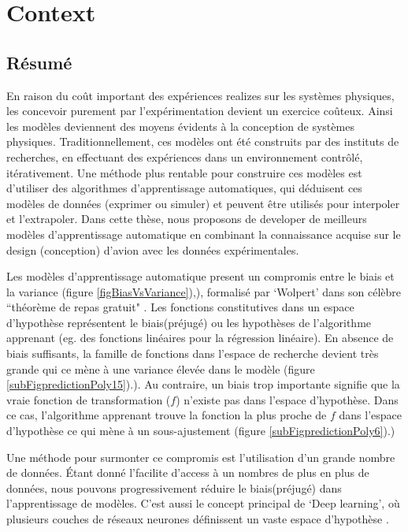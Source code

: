 \chapter{Context}
\label{chapIntroduction}

\begin{mdframed}[hidealllines=true,backgroundcolor=lightgray!20]
\section*{Résumé}
En raison du coût important des expériences realizes sur les systèmes physiques, les concevoir purement par l'expérimentation devient un exercice coûteux. Ainsi les modèles deviennent des moyens évidents à la conception de systèmes physiques. Traditionnellement, ces modèles ont été construits par des instituts de recherches, en effectuant des expériences dans un environnement contrôlé, itérativement. Une méthode plus rentable pour construire ces modèles est  d'utiliser des algorithmes d'apprentissage automatiques, qui déduisent ces modèles de données (exprimer ou simuler) et peuvent être utilisés pour interpoler et l'extrapoler. Dans cette thèse, nous proposons de developer de meilleurs modèles d'apprentissage automatique en combinant la connaissance acquise sur le design (conception) d'avion avec les données expérimentales.

Les modèles d'apprentissage automatique present un compromis entre le biais et la variance (figure \ref{figBiasVsVariance}),), formalisé par `Wolpert' dans son célèbre ``théorème de repas gratuit" \cite{wolpert1997no}. Les fonctions constitutives dans un espace d'hypothèse représentent le biais(préjugé) ou les hypothèses de l'algorithme apprenant (eg. des fonctions linéaires pour la régression linéaire). En absence de biais suffisants, la famille de fonctions dans l'espace de recherche devient très grande qui ce mène à une variance élevée dans le modèle (figure \ref{subFigpredictionPoly15}).). Au contraire, un biais trop importante signifie que la vraie fonction de transformation ($f$) n'existe pas dans l'espace d'hypothèse. Dans ce cas, l'algorithme apprenant trouve la fonction la plus proche de $f$ dans l'espace d'hypothèse ce qui mène à un sous-ajustement (figure \ref{subFigpredictionPoly6}).)

Une méthode pour surmonter ce compromis est l'utilisation d'un grande nombre de données. Étant donné l'facilite d'access à un nombres de plus en plus de données, nous pouvons progressivement réduire le biais(préjugé) dans l'apprentissage de modèles. C'est aussi le concept principal de `Deep learning', où plusieurs couches de réseaux neurones définissent un vaste espace d'hypothèse \cite{Goodfellow-et-al-2016, lecun2015deep}.


\end{mdframed}
